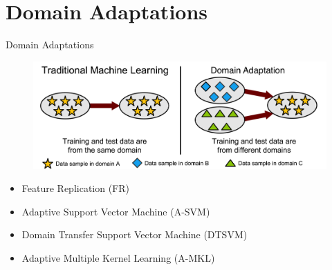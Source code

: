 \section{Domain Adaptations}
\begin{frame}{Domain Adaptations}
	
			\begin{figure}[!ht]
				\centering
				\includegraphics[scale=0.15]{./domainAdaption.png}
			\end{figure}


			\begin{itemize}
				\item Feature Replication \cite{daume2007frustratingly} (FR)
				\item Adaptive Support Vector Machine \cite{yang2007cross} (A-SVM)
				\item Domain Transfer Support Vector Machine \cite{duan2009domain} (DTSVM)
				\item Adaptive Multiple Kernel Learning \cite{duan2012visual} (A-MKL)
			\end{itemize}

\end{frame}






